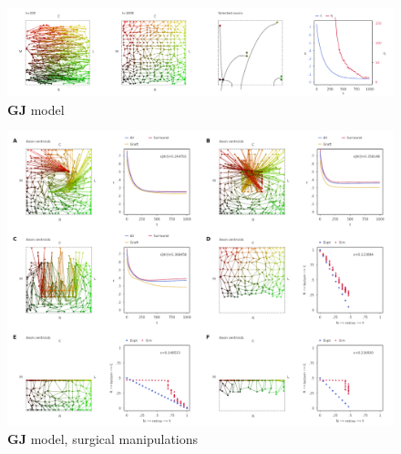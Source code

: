 \documentclass[11pt, a4paper]{article}
\begin{document}
\begin{figure}
\includegraphics[width=\linewidth]{./images/j4_ee_GJ_best_1_wt_figcomp3.png}
\caption{$\mathbf{GJ}$ model}
\label{f:GJ}
\end{figure}

\begin{figure}
\includegraphics[width=\linewidth]{./images/fig_GJ_surgical.png}
\caption{$\mathbf{GJ}$ model, surgical manipulations}
\label{f:GJsurg}
\end{figure}
\end{document}
